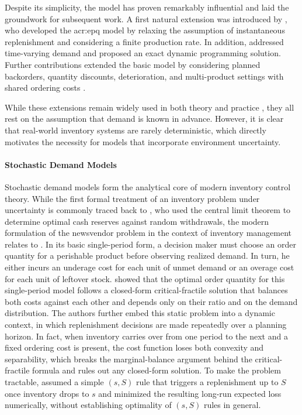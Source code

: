 Despite its simplicity, the model has proven remarkably influential and laid the groundwork for subsequent work. A first natural extension was introduced by \citet{taft1918eoqextension}, who developed the \gls{acr:epq} model by relaxing the assumption of instantaneous replenishment and considering a finite production rate. In addition, \citet{wagner1958eoqextension} addressed time-varying demand and proposed an exact dynamic programming solution. Further contributions extended the basic model by considering planned backorders, quantity discounts, deterioration, and multi-product settings with shared ordering costs \citep[e.g.,][]{hadley1963eoqextension, ghare1963eoqextension, crowther1964eoqextension, goyal1977eoqextension}. 

While these extensions remain widely used in both theory and practice \citep{shekarian2017eoquse, alnahhal2024eoquse}, they all rest on the assumption that demand is known in advance. However, it is clear that real-world inventory systems are rarely deterministic, which directly motivates the necessity for models that incorporate environment uncertainty.\\

\paragraph{\textbf{Stochastic Demand Models}}
Stochastic demand models form the analytical core of modern inventory control theory. While the first formal treatment of an inventory problem under uncertainty is commonly traced back to \citet{edgeworth1888newsvendor}, who used the central limit theorem to determine optimal cash reserves against random withdrawals, the modern formulation of the newsvendor problem in the context of inventory management relates to \citet{arrow1951newsvendor}. In its basic single-period form, a decision maker must choose an order quantity for a perishable product before observing realized demand. In turn, he either incurs an underage cost for each unit of unmet demand or an overage cost for each unit of leftover stock. \citet{arrow1951newsvendor} showed that the optimal order quantity for this single-period model follows a closed-form critical-fractile solution that balances both costs against each other and depends only on their ratio and on the demand distribution. The authors further embed this static problem into a dynamic context, in which replenishment decisions are made repeatedly over a planning horizon. In fact, when inventory carries over from one period to the next and a fixed ordering cost is present, the cost function loses both convexity and separability, which breaks the marginal-balance argument behind the critical-fractile formula and rules out any closed-form solution. To make the problem tractable, \citet{arrow1951newsvendor} assumed a simple $(s, S)$ rule that triggers a replenishment up to $S$ once inventory drops to $s$ and minimized the resulting long-run expected loss numerically, without establishing optimality of $(s, S)$ rules in general.


